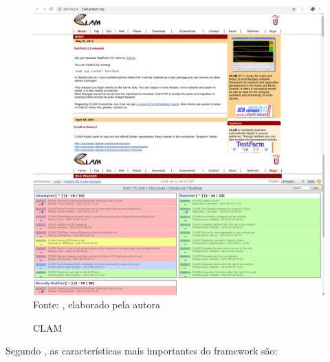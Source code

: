 \begin{figure}[!htb]
   \centering
   \caption{CLAM}\label{fig:clam} 
   \includegraphics[scale=0.2]{figuras/clam.png}
   \\Fonte: \cite{clam}, elaborado pela autora
\end{figure}

Segundo \cite{amatriain2004}, as características mais importantes do framework são:

